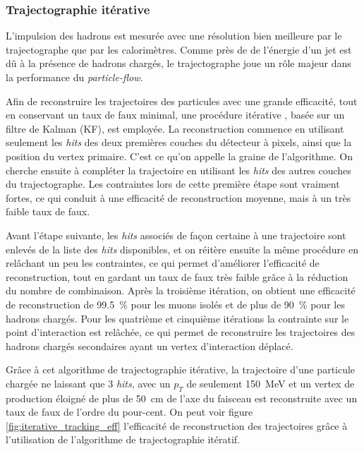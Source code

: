 \subsubsection{Trajectographie itérative} \label{sec:tracks_reconstruction}

L'impulsion des hadrons est mesurée avec une résolution bien meilleure par le trajectographe que par les calorimètres. Comme près de  de l'énergie d'un jet est dû à la présence de hadrons chargés, le trajectographe joue un rôle majeur dans la performance du \emph{particle-flow}.

Afin de reconstruire les trajectoires des particules avec une grande efficacité, tout en conservant un taux de faux minimal, une procédure itérative \citep{cms_tracks}, basée sur un filtre de Kalman (KF), est employée. La reconstruction commence en utilisant seulement les \emph{hits} des deux premières couches du détecteur à pixels, ainsi que la position du vertex primaire. C'est ce qu'on appelle la graine de l'algorithme. On cherche ensuite à compléter la trajectoire en utilisant les \emph{hits} des autres couches du trajectographe. Les contraintes lors de cette première étape sont vraiment fortes, ce qui conduit à une efficacité de reconstruction moyenne, mais à un très faible taux de faux.

Avant l'étape suivante, les \emph{hits} associés de façon certaine à une trajectoire sont enlevés de la liste des \emph{hits} disponibles, et on réitère ensuite la même procédure en relâchant un peu les contraintes, ce qui permet d'améliorer l'efficacité de reconstruction, tout en gardant un taux de faux très faible grâce à la réduction du nombre de combinaison. Après la troisième itération, on obtient une efficacité de reconstruction de \SI{99.5}{\%} pour les muons isolés et de plus de \SI{90}{\%} pour les hadrons chargés. Pour les quatrième et cinquième itérations la contrainte sur le point d'interaction est relâchée, ce qui permet de reconstruire les trajectoires des hadrons chargés secondaires ayant un vertex d'interaction déplacé.

Grâce à cet algorithme de trajectographie itérative, la trajectoire d'une particule chargée ne laissant que 3 \emph{hits}, avec un $p_T$ de seulement \SI{150}{\MeV} et un vertex de production éloigné de plus de \SI{50}{\cm} de l'axe du faisceau est reconstruite avec un taux de faux de l'ordre du pour-cent. On peut voir figure \ref{fig:iterative_tracking_eff} l'efficacité de reconstruction des trajectoires grâce à l'utilisation de l'algorithme de trajectographie itératif.

